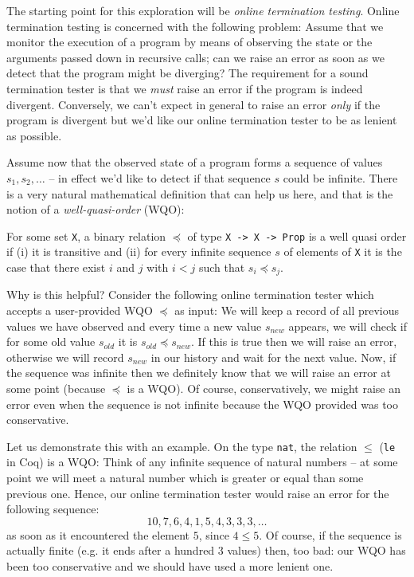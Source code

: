 \documentclass{llncs}
\begin{document}
The starting point for this exploration will be {\em online termination testing}.
Online termination testing is concerned with the following problem: Assume that we monitor the execution 
of a program by means of observing the state or the arguments passed down in recursive calls; can we raise
an error as soon as we detect that the program might be diverging? The requirement for a sound termination tester
is that we {\em must} raise an error if the program is indeed divergent. Conversely, we can't expect in general to raise 
an error {\em only} if the program is divergent but we'd like our online termination tester to be as lenient as possible.

Assume now that the observed state of a program forms a sequence of values $s_1,s_2,\ldots$ -- in effect we'd 
like to detect if that sequence $s$ could be infinite. There is a very natural mathematical definition that
can help us here, and that is the notion of a {\em well-quasi-order} (WQO):

\vspace{5pt}\begin{definition}
For some set \lstinline|X|, a binary relation $\preceq$ of type \lstinline|X -> X -> Prop| is a well quasi order 
if (i) it is transitive and (ii) for every infinite sequence $s$ of elements of \lstinline|X| it is the 
case that there exist $i$ and $j$ with $i < j$ such that $s_i \preceq s_j$. 
\end{definition}

Why is this helpful? Consider the following online termination tester which accepts a user-provided 
WQO $\preceq$ as input: We will keep a record of all previous values we have observed and every time a new 
value $s_{new}$ appears, we will check if for some old value $s_{old}$ it is $s_{old} \preceq s_{new}$. If this is true then we will 
raise an error, otherwise we will record $s_{new}$ in our history and wait for the next value. Now, 
if the sequence was infinite then we definitely know that we will raise an error at some point (because
$\preceq$ is a WQO). Of course, conservatively, we might raise an error even when the sequence is not infinite
because the WQO provided was too conservative. 

Let us demonstrate this with an example. On the type \lstinline|nat|, the relation $\leq$ (\lstinline|le| in Coq) 
is a WQO: Think of any infinite sequence of natural numbers -- at some point we will meet a natural number 
which is greater or equal than some previous one. Hence, our online termination tester would raise an error 
for the following sequence: 
\[ 10,7,6,4,1,5,4,3,3,3,\ldots \] 
as soon as it encountered the element $5$, since $4 \leq 5$. Of course, if the sequence 
is actually finite (e.g. it ends after a hundred $3$ values) then, too bad: our WQO 
has been too conservative and we should have used a more lenient one.
\end{document}
